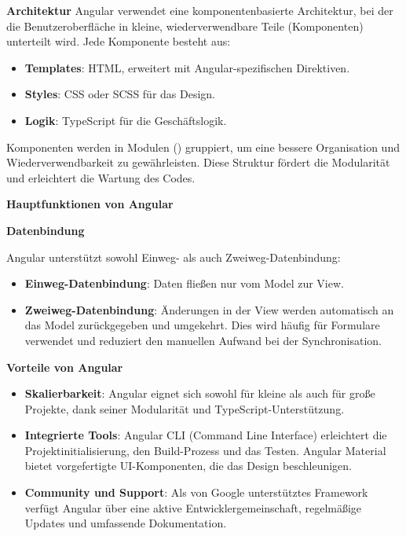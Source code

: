 \textbf{Architektur}
\newline
Angular verwendet eine komponentenbasierte Architektur, bei der die Benutzeroberfläche in kleine, wiederverwendbare Teile (Komponenten) unterteilt wird. Jede Komponente besteht aus:

\begin{itemize}
	\item \textbf{Templates}: HTML, erweitert mit Angular-spezifischen Direktiven.
	\item \textbf{Styles}: CSS oder SCSS für das Design.
	\item \textbf{Logik}: TypeScript für die Geschäftslogik.
\end{itemize}

Komponenten werden in Modulen () gruppiert, um eine bessere Organisation und Wiederverwendbarkeit zu gewährleisten. Diese Struktur fördert die Modularität und erleichtert die Wartung des Codes.\textit{\cite{hutagikar2020analysis, shetty2020review, angular}} \newline

\textbf{Hauptfunktionen von Angular}

\textbf{Datenbindung} 

Angular unterstützt sowohl Einweg- als auch Zweiweg-Datenbindung:

\begin{itemize}
	\item \textbf{Einweg-Datenbindung}: Daten fließen nur vom Model zur View.
	\item \textbf{Zweiweg-Datenbindung}: Änderungen in der View werden automatisch an das Model zurückgegeben und umgekehrt. Dies wird häufig für Formulare verwendet und reduziert den manuellen Aufwand bei der Synchronisation.\textit{\cite{hutagikar2020analysis, madurapperuma2022state, angular}}
\end{itemize}

\textbf{Vorteile von Angular}
\begin{itemize}
	\item \textbf{Skalierbarkeit}: Angular eignet sich sowohl für kleine als auch für große Projekte, dank seiner Modularität und TypeScript-Unterstützung.\textit{\cite{madurapperuma2022state, rathinam2022analysis, angular}}
	
	\item \textbf{Integrierte Tools}: Angular CLI (Command Line Interface) erleichtert die Projektinitialisierung, den Build-Prozess und das Testen. Angular Material bietet vorgefertigte UI-Komponenten, die das Design beschleunigen.\textit{\cite{hutagikar2020analysis, angular_blog}}
	
	\item \textbf{Community und Support}: Als von Google unterstütztes Framework verfügt Angular über eine aktive Entwicklergemeinschaft, regelmäßige Updates und umfassende Dokumentation.\textit{\cite{shetty2020review, angular}}
\end{itemize}

